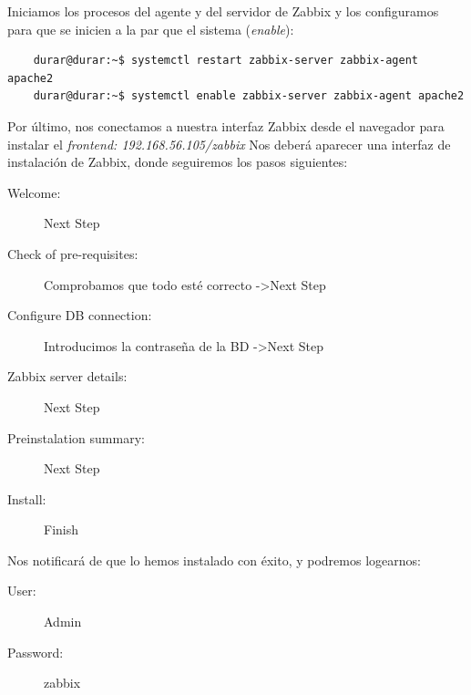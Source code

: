 \documentclass[a4paper]{article}
\begin{document}
Iniciamos los procesos del agente y del servidor de Zabbix y los configuramos
 para que se inicien a la par que el sistema (\textsl{enable}):\newpage
\begin{lstlisting}
    durar@durar:~$ systemctl restart zabbix-server zabbix-agent apache2
    durar@durar:~$ systemctl enable zabbix-server zabbix-agent apache2
\end{lstlisting}
Por último, nos conectamos a nuestra interfaz Zabbix desde el navegador para
instalar el \textsl{frontend: 192.168.56.105/zabbix} \newline
Nos deberá aparecer una interfaz de instalación de Zabbix, donde seguiremos los pasos siguientes:
\begin{description}
    \item[Welcome:] Next Step 
    \item[Check of pre-requisites:] Comprobamos que todo esté correcto -\textgreater Next Step
    \item[Configure DB connection:] Introducimos la contraseña de la BD -\textgreater Next Step   
    \item[Zabbix server details:] Next Step
    \item[Preinstalation summary:] Next Step
    \item[Install:] Finish   
\end{description}
Nos notificará de que lo hemos instalado con éxito, y podremos logearnos:
\begin{description}
    \item[User:] Admin
    \item[Password:] zabbix  
\end{description}
\end{document}
